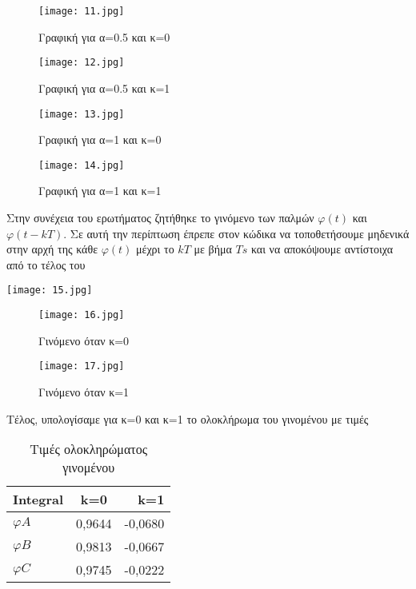 \documentclass[11pt]{article}
\newcommand{\np}{\newpage}	%
\begin{document}
\begin{figure}[ht]
  \centering
  \begin{minipage}{0.45\textwidth}
    \texttt{[image: 11.jpg]}
    \caption{Γραφική για α=0.5 και κ=0}
  \end{minipage}
  \hfill
  \begin{minipage}{0.45\textwidth}
    \texttt{[image: 12.jpg]}
    \caption{Γραφική για α=0.5 και κ=1}
  \end{minipage}
\end{figure}

\begin{figure}[!ht]
  \centering
  \begin{minipage}{0.45\textwidth}
    \texttt{[image: 13.jpg]}
    \caption{Γραφική για α=1 και κ=0}
  \end{minipage}
  \hfill
  \begin{minipage}{0.45\textwidth}
    \texttt{[image: 14.jpg]}
    \caption{Γραφική για α=1 και κ=1}
  \end{minipage}
\end{figure}

\np
\hfill
Στην συνέχεια του ερωτήματος ζητήθηκε το γινόμενο των παλμών $φ(t)$ και $φ(t-kΤ)$. Σε αυτή την περίπτωση έπρεπε στον κώδικα να τοποθετήσουμε μηδενικά στην αρχή της κάθε $φ(t)$ μέχρι το $kT$ με βήμα $Ts$ και να αποκόψουμε αντίστοιχα από το τέλος του

\texttt{[image: 15.jpg]}

\begin{figure}[ht]
  \centering
  \begin{minipage}{0.45\textwidth}
    \texttt{[image: 16.jpg]}
    \caption{Γινόμενο όταν κ=0}
  \end{minipage}
  \hfill
  \begin{minipage}{0.45\textwidth}
    \texttt{[image: 17.jpg]}
    \caption{Γινόμενο όταν κ=1}
  \end{minipage}
\end{figure}

Τέλος, υπολογίσαμε για κ=0 και κ=1 το ολοκλήρωμα του γινομένου με τιμές
\hfill
\np

\begin{table}[ht]
	\centering
	\caption{Τιμές ολοκληρώματος γινομένου}
	\begin{tabular}{l|c|r}
		\foreignlanguage{english}{Integral}&k=0&k=1\\
		\hline
		$φΑ$ & 0,9644 & -0,0680\\
		$φΒ$ & 0,9813 & -0,0667\\
		$φC$ & 0,9745 & -0,0222\\
	\end{tabular}
\end{table}
\end{document}
